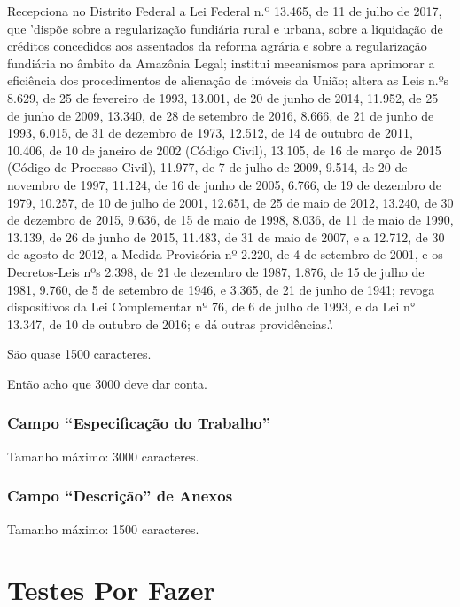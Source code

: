 Recepciona no Distrito Federal a Lei Federal n.º 13.465, de 11 de julho de 2017, que 'dispõe sobre a regularização fundiária rural e urbana, sobre a liquidação de créditos concedidos aos assentados da reforma agrária e sobre a regularização fundiária no âmbito da Amazônia Legal; institui mecanismos para aprimorar a eficiência dos procedimentos de alienação de imóveis da União; altera as Leis n.ºs 8.629, de 25 de fevereiro de 1993, 13.001, de 20 de junho de 2014, 11.952, de 25 de junho de 2009, 13.340, de 28 de setembro de 2016, 8.666, de 21 de junho de 1993, 6.015, de 31 de dezembro de 1973, 12.512, de 14 de outubro de 2011, 10.406, de 10 de janeiro de 2002 (Código Civil), 13.105, de 16 de março de 2015 (Código de Processo Civil), 11.977, de 7 de julho de 2009, 9.514, de 20 de novembro de 1997, 11.124, de 16 de junho de 2005, 6.766, de 19 de dezembro de 1979, 10.257, de 10 de julho de 2001, 12.651, de 25 de maio de 2012, 13.240, de 30 de dezembro de 2015, 9.636, de 15 de maio de 1998, 8.036, de 11 de maio de 1990, 13.139, de 26 de junho de 2015, 11.483, de 31 de maio de 2007, e a 12.712, de 30 de agosto de 2012, a Medida Provisória nº 2.220, de 4 de setembro de 2001, e os Decretos-Leis nºs 2.398, de 21 de dezembro de 1987, 1.876, de 15 de julho de 1981, 9.760, de 5 de setembro de 1946, e 3.365, de 21 de junho de 1941; revoga dispositivos da Lei Complementar nº 76, de 6 de julho de 1993, e da Lei n° 13.347, de 10 de outubro de 2016; e dá outras providências.'.

São quase 1500 caracteres.

Então acho que 3000 deve dar conta.

\subsubsection{Campo ``Especificação do Trabalho''}

Tamanho máximo: 3000 caracteres.

\subsubsection{Campo ``Descrição'' de Anexos}

Tamanho máximo: 1500 caracteres.








\section{Testes Por Fazer} 

